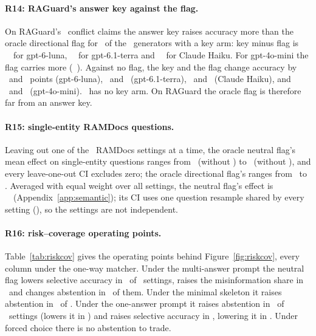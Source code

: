 \paragraph{R14: RAGuard's answer key against the flag.} On RAGuard's \rgKeyN\ conflict claims the answer key raises
accuracy more than the oracle directional flag for \rgKeyAbove\ of the \rgKeyGens\ generators with a key arm: key
minus flag is \rgKeyKeyFlagLuna\ \rgKeyKeyFlagLunaCI\ for gpt-6-luna, \rgKeyKeyFlagTerra\ \rgKeyKeyFlagTerraCI\ for
gpt-6.1-terra and \rgKeyKeyFlagHaiku\ \rgKeyKeyFlagHaikuCI\ for Claude Haiku. For gpt-4o-mini the flag carries more
(\rgKeyKeyFlagMini\ \rgKeyKeyFlagMiniCI). Against no flag, the key and the flag change accuracy by
\zRgLunaAnswerKeyConflict\ and \zRgLunaOracleFlagDirectionalConflict\ points (gpt-6-luna),
\zRgTerraAnswerKeyConflict\ and \zRgTerraOracleFlagDirectionalConflict\ (gpt-6.1-terra), \zRgHaikuAnswerKeyConflict\
and \zRgHaikuOracleFlagDirectionalConflict\ (Claude Haiku), and \zRgMiniAnswerKeyConflict\ and
\zRgMiniOracleFlagDirectionalConflict\ (gpt-4o-mini). \rgKeyNotRun\ has no key arm. On RAGuard the oracle flag is
therefore far from an answer key.

\paragraph{R15: single-entity RAMDocs questions.} Leaving out one of the \seLooNeuK\ RAMDocs settings at a time, the
oracle neutral flag's mean effect on single-entity questions ranges from \seLooNeuLo\ (without \seLooNeuLoDrop) to
\seLooNeuHi\ (without \seLooNeuHiDrop), and every leave-one-out CI excludes zero; the oracle directional flag's ranges
from \seLooDirLo\ to \seLooDirHi. Averaged with equal weight over all settings, the neutral flag's effect is \entNeuSingle\
\entNeuSingleCI\ (Appendix~\ref{app:semantic}); its CI uses one question resample shared by every setting
(\prs{18.2}), so the settings are not independent.


\paragraph{R16: risk--coverage operating points.} Table~\ref{tab:riskcov} gives the operating points behind
Figure~\ref{fig:riskcov}, every column under the one-way matcher. Under the multi-answer prompt the neutral flag lowers
selective accuracy in \rcMultiSelDown\ of \rcMultiN\ settings, raises the misinformation share in \rcMultiMisUp\ and
changes abstention in \rcMultiAbst\ of them. Under the minimal skeleton it raises abstention in \rcMinimalAbstUp\ of
\rcMinimalN. Under the one-answer prompt it raises abstention in \rcSingleAbstUp\ of \rcSingleN\ settings (lowers it in
\rcSingleAbstDown) and raises selective accuracy in \rcSingleSelUp, lowering it in \rcSingleSelDown. Under forced
choice there is no abstention to trade.

